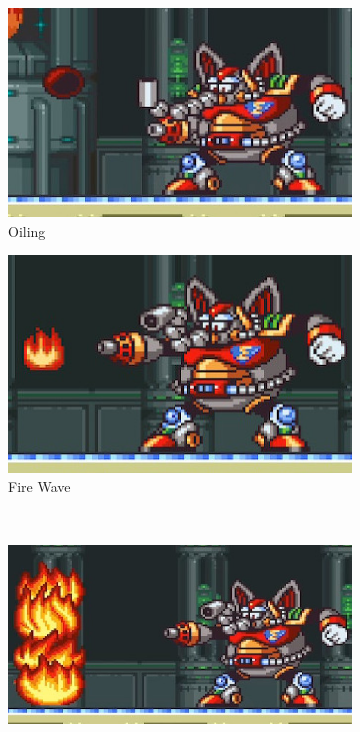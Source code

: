 \begin{figure}[htp]
	\centering
	\begin{subfigure}{0.4\textwidth}
		\centering
		\includegraphics[width=\linewidth]{figures/X1/Flame_mammoth/Mammoth_oil.jpg}
		\caption{Oiling}
	\end{subfigure}
	\begin{subfigure}{0.4\textwidth}
		\centering
		\includegraphics[width=\linewidth]{figures/X1/Flame_mammoth/Mammoth_fire.jpg}
		\caption{Fire Wave}
	\end{subfigure}\\
	\begin{subfigure}{0.5\textwidth}
		\centering
		\includegraphics[width=\linewidth]{figures/X1/Flame_mammoth/Mammoth_oil_fire.jpg}

\end{subfigure}
\end{figure}
